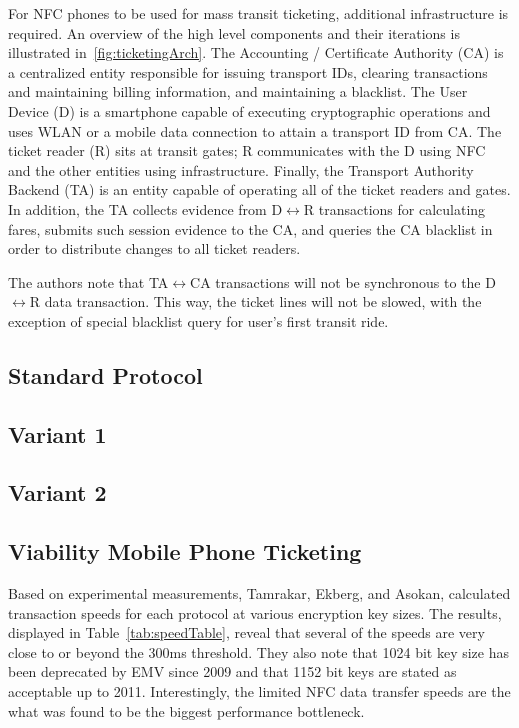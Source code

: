 \documentclass{sig-alternate}
\begin{document}
For NFC phones to be used for mass transit ticketing, additional infrastructure is required. An overview of the high level components and their iterations is illustrated in~\ref{fig:ticketingArch}. The Accounting / Certificate Authority (CA) is a centralized entity responsible for issuing transport IDs, clearing transactions and maintaining billing information, and maintaining a blacklist. The User Device (D) is a smartphone capable of executing cryptographic operations and uses WLAN or a mobile data connection to attain a transport ID from CA. The ticket reader (R) sits at transit gates; R communicates with the D using NFC and the other entities using infrastructure. Finally, the Transport Authority Backend (TA) is an entity capable of operating all of the ticket readers and gates. In addition, the TA collects evidence from D$\leftrightarrow$R transactions for calculating fares, submits such session evidence to the CA, and queries the CA blacklist in order to distribute changes to all ticket readers.

The authors note that TA$\leftrightarrow$CA transactions will not be synchronous to the D$\leftrightarrow$R data transaction. This way, the ticket lines will not be slowed, with the exception of special blacklist query for user's first transit ride.

\subsection{Standard Protocol}

\subsection{Variant 1}

\subsection{Variant 2}

\subsection{Viability Mobile Phone Ticketing}
Based on experimental measurements, Tamrakar, Ekberg, and Asokan, calculated transaction speeds for each protocol at various encryption key sizes. The results, displayed in Table~\ref{tab:speedTable}, reveal that several of the speeds are very close to or beyond the 300ms threshold. They also note that 1024 bit key size has been deprecated by EMV since 2009 and that 1152 bit keys are stated as acceptable up to 2011. Interestingly, the limited NFC data transfer speeds are the what was found to be the biggest performance bottleneck. 
\end{document}
